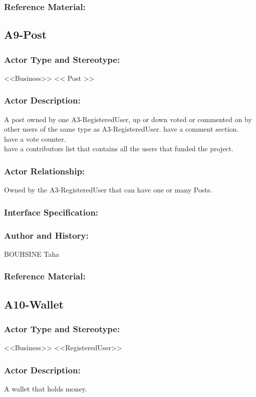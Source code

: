 \documentclass[11pt, openany]{report}
\begin{document}
\subsubsection{Reference Material:}

\clearpage
\subsection{A9-Post}
\label{A9}
\subsubsection{Actor Type and Stereotype:}
<<Business>> << Post >>
\subsubsection{Actor Description:}
A post owned by one A3-RegisteredUser, up or down voted or commented on by other users of the same type as A3-RegisteredUser.
have a comment section.\\
have a vote counter.\\
have a contributors list that contains all the users that funded the project.\\
\subsubsection{Actor Relationship:}
Owned by the A3-RegisteredUser that can have one or many Posts.
\subsubsection{Interface Specification:}
\subsubsection{Author and History:}
BOUHSINE Taha
\subsubsection{Reference Material:}

\clearpage
\subsection{A10-Wallet}
\label{A10}
\subsubsection{Actor Type and Stereotype:}
<<Business>> <<RegisteredUser>>
\subsubsection{Actor Description:}
A wallet that holds money.
\end{document}
